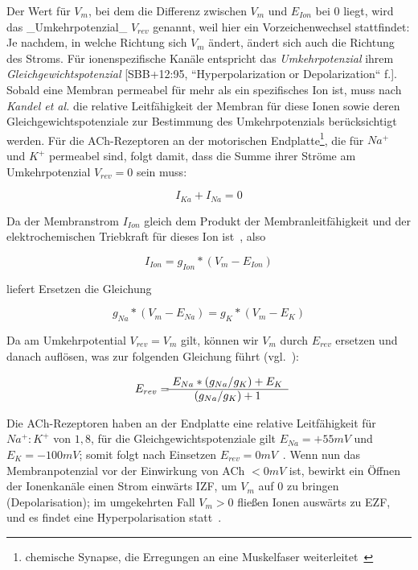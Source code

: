 {{{Der Wert für $V_m$, bei dem die Differenz zwischen $V_m$ und $E_{Ion}$ bei $0$ liegt, wird das _Umkehrpotenzial_ $V_{rev}$ genannt, weil hier ein Vorzeichenwechsel stattfindet: Je nachdem, in welche Richtung sich $V_m$ ändert, ändert sich auch die Richtung des Stroms. 
Für ionenspezifische Kanäle entspricht das \textit{Umkehrpotenzial} ihrem \textit{Gleichgewichtspotenzial} [SBB+12:95, ``Hyperpolarization or Depolarization`` f.].\\

Sobald eine Membran permeabel für mehr als ein spezifisches Ion ist, muss nach \textit{Kandel et al.} die relative Leitfähigkeit der Membran für diese Ionen sowie deren Gleichgewichtspotenziale zur Bestimmung des Umkehrpotenzials berücksichtigt werden.
Für die ACh-Rezeptoren an der motorischen Endplatte\footnote{
 chemische Synapse, die Erregungen an eine Muskelfaser weiterleitet~\cite[56]{SD07}
}, die für $Na^+$ und $K^+$ permeabel sind, folgt damit, dass die Summe ihrer Ströme am Umkehrpotenzial $V_{rev} = 0$ sein muss:

\begin{equation}
I_{Ka} + I_{Na} = 0
\end{equation}

Da der Membranstrom $I_{Ion}$ gleich dem Produkt der Membranleitfähigkeit und der elektrochemischen Triebkraft für dieses Ion ist~\cite[93]{BCP18}, also

\begin{equation}
I_{Ion} = g_{Ion} * (V_m - E_{Ion})
\end{equation}

liefert Ersetzen die Gleichung

\begin{equation}
g_{Na} * (V_m - E_{Na}) = g_{K} * (V_m - E_{K})
\end{equation}

Da am Umkehrpotential $V_{rev} = V_m$ gilt, können wir $V_m$ durch $E_{rev}$ ersetzen und danach auflösen, was zur folgenden Gleichung führt (vgl.~\cite[196, Box 9-1]{KSJ+13}):

\begin{equation}
E_{rev} = \begin{matrix}
            E_{Na} \space * \space (g_{Na} \space / \space g_{K}) \space + \space E_{K}  \\ \hline
            (g_{Na} \space / \space g_{K}) \space + 1
\end{matrix}
\end{equation}

Die ACh-Rezeptoren haben an der Endplatte eine relative Leitfähigkeit für $Na^+:K^+$ von $1,8$, für die Gleichgewichtspotenziale gilt $E_{Na} = +55 mV$ und $E_{K} = -100 mV$; somit folgt nach Einsetzen $E_{rev} = 0mV$~\cite[100]{HS19a}.
Wenn nun das Membranpotenzial vor der Einwirkung von ACh $< 0mV$ ist, bewirkt ein Öffnen der Ionenkanäle einen Strom einwärts IZF, um $V_m$ auf $0$ zu bringen (Depolarisation); im umgekehrten Fall $V_m > 0$ fließen Ionen auswärts zu EZF, und es findet eine Hyperpolarisation statt~\cite[136, Exkurs 5.4]{BCP18}.\\

}}}
